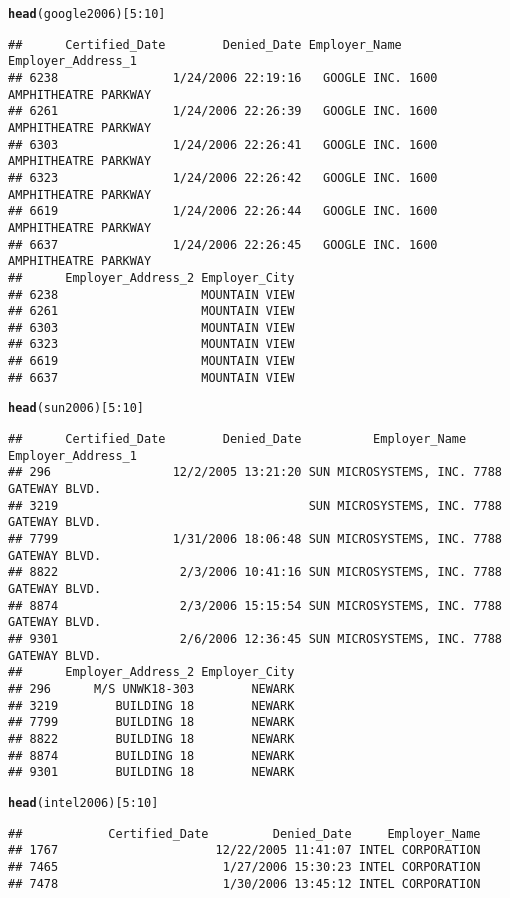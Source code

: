 \documentclass{article}\usepackage{graphicx, color}
\makeatletter
\newcommand{\hlfunctioncall}[1]{\textcolor[rgb]{0.501960784313725,0,0.329411764705882}{\textbf{#1}}}%
\newenvironment{kframe}{%
 \def\at@end@of@kframe{}%
 \ifinner\ifhmode%
  \def\at@end@of@kframe{\end{minipage}}%
  \begin{minipage}{\columnwidth}%
 \fi\fi%
 \def\FrameCommand##1{\hskip\@totalleftmargin \hskip-\fboxsep
 \colorbox{shadecolor}{##1}\hskip-\fboxsep
     \hskip-\linewidth \hskip-\@totalleftmargin \hskip\columnwidth}%
 \MakeFramed {\advance\hsize-\width
   \@totalleftmargin\z@ \linewidth\hsize
   \@setminipage}}%
 {\par\unskip\endMakeFramed%
 \at@end@of@kframe}
\newenvironment{knitrout}{}{} %
\makeatother
\begin{document}
\begin{knitrout}
\begin{kframe}
\begin{alltt}
\hlfunctioncall{head}(google2006)[5:10]
\end{alltt}
\begin{verbatim}
##      Certified_Date        Denied_Date Employer_Name        Employer_Address_1
## 6238                1/24/2006 22:19:16   GOOGLE INC. 1600 AMPHITHEATRE PARKWAY
## 6261                1/24/2006 22:26:39   GOOGLE INC. 1600 AMPHITHEATRE PARKWAY
## 6303                1/24/2006 22:26:41   GOOGLE INC. 1600 AMPHITHEATRE PARKWAY
## 6323                1/24/2006 22:26:42   GOOGLE INC. 1600 AMPHITHEATRE PARKWAY
## 6619                1/24/2006 22:26:44   GOOGLE INC. 1600 AMPHITHEATRE PARKWAY
## 6637                1/24/2006 22:26:45   GOOGLE INC. 1600 AMPHITHEATRE PARKWAY
##      Employer_Address_2 Employer_City
## 6238                    MOUNTAIN VIEW
## 6261                    MOUNTAIN VIEW
## 6303                    MOUNTAIN VIEW
## 6323                    MOUNTAIN VIEW
## 6619                    MOUNTAIN VIEW
## 6637                    MOUNTAIN VIEW
\end{verbatim}
\begin{alltt}
\hlfunctioncall{head}(sun2006)[5:10]
\end{alltt}
\begin{verbatim}
##      Certified_Date        Denied_Date          Employer_Name Employer_Address_1
## 296                 12/2/2005 13:21:20 SUN MICROSYSTEMS, INC. 7788 GATEWAY BLVD.
## 3219                                   SUN MICROSYSTEMS, INC. 7788 GATEWAY BLVD.
## 7799                1/31/2006 18:06:48 SUN MICROSYSTEMS, INC. 7788 GATEWAY BLVD.
## 8822                 2/3/2006 10:41:16 SUN MICROSYSTEMS, INC. 7788 GATEWAY BLVD.
## 8874                 2/3/2006 15:15:54 SUN MICROSYSTEMS, INC. 7788 GATEWAY BLVD.
## 9301                 2/6/2006 12:36:45 SUN MICROSYSTEMS, INC. 7788 GATEWAY BLVD.
##      Employer_Address_2 Employer_City
## 296      M/S UNWK18-303        NEWARK
## 3219        BUILDING 18        NEWARK
## 7799        BUILDING 18        NEWARK
## 8822        BUILDING 18        NEWARK
## 8874        BUILDING 18        NEWARK
## 9301        BUILDING 18        NEWARK
\end{verbatim}
\begin{alltt}
\hlfunctioncall{head}(intel2006)[5:10]
\end{alltt}
\begin{verbatim}
##            Certified_Date         Denied_Date     Employer_Name
## 1767                      12/22/2005 11:41:07 INTEL CORPORATION
## 7465                       1/27/2006 15:30:23 INTEL CORPORATION
## 7478                       1/30/2006 13:45:12 INTEL CORPORATION

\end{verbatim}
\end{kframe}
\end{knitrout}
\end{document}
